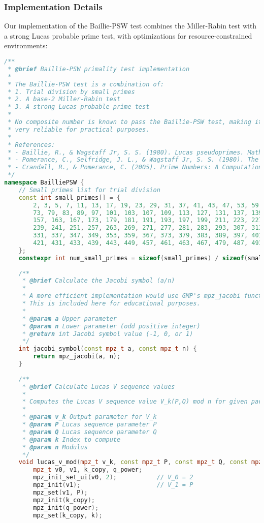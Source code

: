 \subsubsection{Implementation Details}

Our implementation of the Baillie-PSW test combines the Miller-Rabin test with a strong Lucas probable prime test, with optimizations for resource-constrained environments:

\begin{lstlisting}[language=C++, caption=Baillie-PSW Test Implementation]
/**
 * @brief Baillie-PSW primality test implementation
 * 
 * The Baillie-PSW test is a combination of:
 * 1. Trial division by small primes
 * 2. A base-2 Miller-Rabin test
 * 3. A strong Lucas probable prime test
 * 
 * No composite number is known to pass the Baillie-PSW test, making it
 * very reliable for practical purposes.
 * 
 * References:
 * - Baillie, R., & Wagstaff Jr, S. S. (1980). Lucas pseudoprimes. Mathematics of Computation, 35(152), 1391-1417.
 * - Pomerance, C., Selfridge, J. L., & Wagstaff Jr, S. S. (1980). The pseudoprimes to 25·10⁹.
 * - Crandall, R., & Pomerance, C. (2005). Prime Numbers: A Computational Perspective. Springer.
 */
namespace BailliePSW {
    // Small primes list for trial division
    const int small_primes[] = {
        2, 3, 5, 7, 11, 13, 17, 19, 23, 29, 31, 37, 41, 43, 47, 53, 59, 61, 67, 71, 
        73, 79, 83, 89, 97, 101, 103, 107, 109, 113, 127, 131, 137, 139, 149, 151, 
        157, 163, 167, 173, 179, 181, 191, 193, 197, 199, 211, 223, 227, 229, 233, 
        239, 241, 251, 257, 263, 269, 271, 277, 281, 283, 293, 307, 311, 313, 317, 
        331, 337, 347, 349, 353, 359, 367, 373, 379, 383, 389, 397, 401, 409, 419, 
        421, 431, 433, 439, 443, 449, 457, 461, 463, 467, 479, 487, 491, 499, 503, 509
    };
    constexpr int num_small_primes = sizeof(small_primes) / sizeof(small_primes[0]);
    
    /**
     * @brief Calculate the Jacobi symbol (a/n)
     * 
     * A more efficient implementation would use GMP's mpz_jacobi function.
     * This is included here for educational purposes.
     * 
     * @param a Upper parameter
     * @param n Lower parameter (odd positive integer)
     * @return int Jacobi symbol value (-1, 0, or 1)
     */
    int jacobi_symbol(const mpz_t a, const mpz_t n) {
        return mpz_jacobi(a, n);
    }
    
    /**
     * @brief Calculate Lucas V sequence values
     * 
     * Computes the Lucas V sequence value V_k(P,Q) mod n for given parameters.
     * 
     * @param v_k Output parameter for V_k
     * @param P Lucas sequence parameter P
     * @param Q Lucas sequence parameter Q
     * @param k Index to compute
     * @param n Modulus
     */
    void lucas_v_mod(mpz_t v_k, const mpz_t P, const mpz_t Q, const mpz_t k, const mpz_t n) {
        mpz_t v0, v1, k_copy, q_power;
        mpz_init_set_ui(v0, 2);           // V_0 = 2
        mpz_init(v1);                     // V_1 = P
        mpz_set(v1, P);                   
        mpz_init(k_copy);
        mpz_init(q_power);
        mpz_set(k_copy, k);
        

\end{lstlisting}
